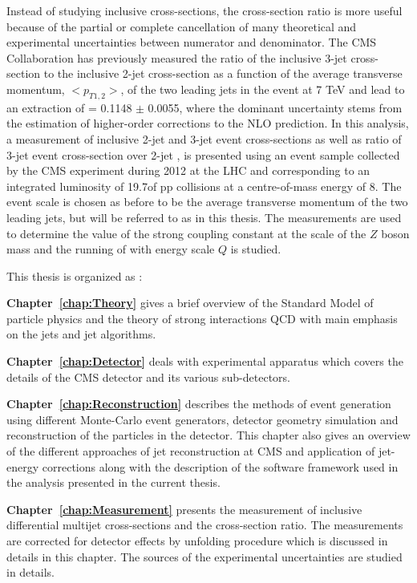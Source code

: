Instead of studying inclusive cross-sections, the cross-section ratio is more useful because of the partial or complete cancellation of many theoretical and experimental uncertainties between numerator and denominator. The CMS Collaboration has previously measured the ratio of the inclusive 3-jet cross-section to the inclusive 2-jet cross-section as a function of the average transverse momentum, $<p_{T1,2}>$, of the two leading jets in the event at 7 TeV \cite {Chatrchyan:2013txa} and lead to an extraction of \alpsmz = 0.1148 $\pm$ 0.0055, where the dominant uncertainty stems from the estimation of higher-order corrections to the NLO prediction. In this analysis, a measurement of inclusive 2-jet and 3-jet event cross-sections as well as ratio of 3-jet event cross-section over 2-jet \rations, is presented using an event sample collected by the CMS experiment during 2012 at the LHC and corresponding to an integrated luminosity of 19.7\fbinv of pp collisions at a centre-of-mass energy of 8\TeV. The event scale is chosen as before to be the average transverse momentum of the two leading jets, but will be referred to as \httwo in this thesis. The measurements are used to determine the value of the strong coupling constant at the scale of the $Z$ boson mass \alpsmz and the running of \alps with energy scale $Q$ is studied.

This thesis is organized as :

{\bf Chapter~\ref{chap:Theory}} gives a brief overview of the Standard Model of particle physics and the theory of strong interactions QCD with main emphasis on the jets and jet algorithms. 

{\bf Chapter~\ref{chap:Detector}} deals with experimental apparatus which covers the details of the CMS detector and its various sub-detectors.

{\bf Chapter~\ref{chap:Reconstruction}} describes the methods of event generation using different Monte-Carlo event generators, detector geometry simulation and reconstruction of the particles in the detector. This chapter also gives an overview of the different approaches of jet reconstruction at CMS and application of jet-energy corrections along with the description of the software framework used in the analysis presented in the current thesis.

{\bf Chapter~\ref{chap:Measurement}} presents the measurement of inclusive differential multijet cross-sections and the cross-section ratio. The measurements are corrected for detector effects by unfolding procedure which is discussed in details in this chapter. The sources of the experimental uncertainties are studied in details. 


